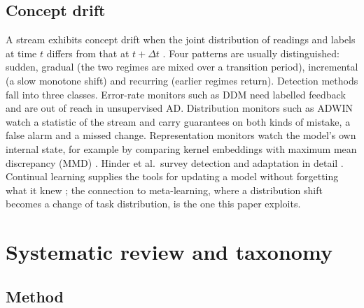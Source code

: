 \hypertarget{concept-drift}{%
\subsection{Concept drift}\label{concept-drift}}

A stream exhibits concept drift when the joint distribution of readings and labels at time \(t\) differs from that at \(t + \Delta t\) \citep{gama2014drift, lu2019drift}. Four patterns are usually distinguished: sudden, gradual (the two regimes are mixed over a transition period), incremental (a slow monotone shift) and recurring (earlier regimes return). Detection methods fall into three classes. Error-rate monitors such as DDM \citep{gama2004ddm} need labelled feedback and are out of reach in unsupervised AD. Distribution monitors such as ADWIN \citep{bifet2007adwin} watch a statistic of the stream and carry guarantees on both kinds of mistake, a false alarm and a missed change. Representation monitors watch the model's own internal state, for example by comparing kernel embeddings with maximum mean discrepancy (MMD) \citep{gretton2012mmd}. Hinder et al.~survey detection and adaptation in detail \citep{hinder2024a, hinder2024b}. Continual learning supplies the tools for updating a model without forgetting what it knew \citep{kirkpatrick2017ewc, rolnick2019replay, wang2024continual}; the connection to meta-learning, where a distribution shift becomes a change of task distribution, is the one this paper exploits.

\hypertarget{systematic-review-and-taxonomy}{%
\section{Systematic review and taxonomy}\label{systematic-review-and-taxonomy}}

\hypertarget{method}{%
\subsection{Method}\label{method}}

